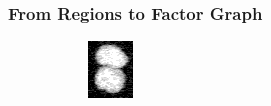 \begin{frame}
    \frametitle{From Regions to Factor Graph}
    \begin{minipage}[t][0.4\textheight][t]{\textwidth}%
        \begin{figure}
            \centering
            \begin{subfigure}[t]{0.23\textwidth}
                \centering
                \includegraphics[width=\textwidth]{images/joint/overseg/75/02/raw_contrast.png}
            \end{subfigure}%
            \hfill%
            \begin{subfigure}[t]{0.23\textwidth}
                \centering
\end{subfigure}
\end{figure}
\end{minipage}
\end{frame}
